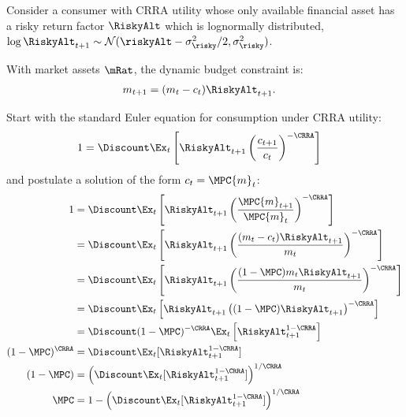 
Consider a consumer with CRRA utility whose only available financial asset has a risky return factor
  $\RiskyAlt$ which is lognormally distributed, $\log
  \RiskyAlt_{t+1} \sim \mathcal{N}({\riskyAlt} -
  \sigma_{\risky}^{2}/2,\sigma_{\risky}^{2})$.

With market assets $\mRat$, the dynamic budget constraint is:
\begin{equation}\begin{gathered}\begin{aligned}
        {m}_{t+1} & =  ({m}_{t}-c_{t})\RiskyAlt_{t+1}.
\end{aligned}\end{gathered}\end{equation}

Start with the standard Euler equation for consumption under CRRA utility:
\begin{equation}\begin{gathered}\begin{aligned}
        1 & =  \Discount
        \Ex_{t}\left[\RiskyAlt_{t+1}\left(\frac{c_{t+1}}{c_{t}}\right)^{-\CRRA}\right]
\end{aligned}\end{gathered}\end{equation}
and postulate a solution of the form $c_{t} = \MPC {m}_{t}$: 
\begin{equation}\begin{gathered}\begin{aligned}
        1 & =  \Discount  \Ex_{t}\left[\RiskyAlt_{t+1}\left(\frac{\MPC {m}_{t+1}}{\MPC {m}_{t}}\right)^{-\CRRA}\right]  \notag \\
         & =  \Discount  \Ex_{t}\left[\RiskyAlt_{t+1}\left(\frac{({m}_{t}-c_{t})\RiskyAlt_{t+1}}{ {m}_{t}}\right)^{-\CRRA}\right]  \notag \\
         & =  \Discount  \Ex_{t}\left[\RiskyAlt_{t+1}\left(\frac{(1-\MPC){m}_{t}\RiskyAlt_{t+1}}{ {m}_{t}}\right)^{-\CRRA}\right]  \label{eq:onlyx} \notag \\
         & =  \Discount  \Ex_{t}\left[\RiskyAlt_{t+1}\left((1-\MPC)\RiskyAlt_{t+1}\right)^{-\CRRA}\right]  \notag \\
         & =  \Discount  (1-\MPC)^{-\CRRA}\Ex_{t}\left[\RiskyAlt_{t+1}^{1-\CRRA}\right]
\notag \\ (1-\MPC)^{\CRRA} & =  \Discount  \Ex_{t}[\RiskyAlt_{t+1}^{1-\CRRA}]
\notag \\ (1-\MPC) & =  \left(\Discount  \Ex_{t}[\RiskyAlt_{t+1}^{1-\CRRA}]\right)^{1/\CRRA} \notag
\\  \MPC & =  1- \left(\Discount  \Ex_{t}[\RiskyAlt_{t+1}^{1-\CRRA}]\right)^{1/\CRRA}
\end{aligned}\end{gathered}\end{equation}
